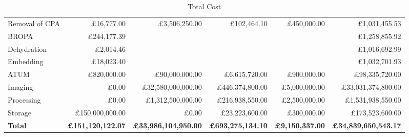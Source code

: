 \documentclass[a4paper, 11pt]{article}
\numberwithin{equation}{section}
\begin{document}
\begin{table}[H]
{\begin{tabular}{|l|r|r|r|r|r|}
Removal of CPA                & \pounds 16,777.00                    & \multirow{4}{*}{\pounds 3,506,250.00} & \multirow{4}{*}{\pounds 102,464.10}   & \multirow{4}{*}{\pounds 450,000.00} & \pounds 1,031,455.53                   \\ \cline{1-2} \cline{6-6} 
BROPA                         & \pounds 244,177.39                   &                                &                                &                              & \pounds 1,258,855.92                   \\ \cline{1-2} \cline{6-6} 
Dehydration                   & \pounds 2,014.46                     &                                &                                &                              & \pounds 1,016,692.99                   \\ \cline{1-2} \cline{6-6} 
Embedding                     & \pounds 18,023.40                    &                                &                                &                              & \pounds 1,032,701.93                   \\ \hline
ATUM                          & \pounds 820,000.00                   & \pounds 90,000,000.00               & \pounds 6,615,720.00                  & \pounds 900,000.00                  & \pounds 98,335,720.00                \\ \hline
Imaging                       & \pounds 0.00                         & \pounds 32,580,000,000.00         & \pounds 446,374,800.00                & \pounds 5,000,000.00                & \pounds 33,031,374,800.00 \\ \hline
Processing                    & \pounds 0.00                         & \pounds 1,312,500,000.00                & \pounds 216,938,550.00                & \pounds 2,500,000.00                & \pounds 1,531,938,550.00              \\ \hline
Storage                       & \pounds 150,000,000.00               & \pounds 0.00                          & \pounds 23,223,600.00                 & \pounds 300,000.00                  & \pounds 173,523,600.00                 \\ \hline
\textbf{Total}                & \textbf{\pounds 151,120,122.07}      & \textbf{\pounds 33,986,104,950.00
}    & \textbf{\pounds 693,275,134.10
}       & \textbf{\pounds 9,150,337.00
}       & \textbf{\pounds 34,839,650,543.17}     \\ \hline
\end{tabular}
}
\captionsetup{justification=centering}
\caption{Total Cost}
\label{table:totalcost}
\end{table}
\end{document}
